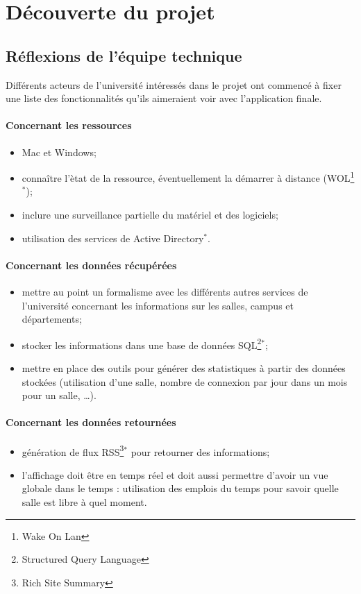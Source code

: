 \chapter{D\'ecouverte du projet}

\section{R\'eflexions de l'\'equipe technique}

Diff\'erents acteurs de l'universit\'e int\'eress\'es dans le projet \YuukouII{} ont commenc\'e \`a fixer une liste des fonctionnalit\'es qu'ils aimeraient voir avec l'application finale.

\subsubsection{Concernant les ressources}
\begin{itemize}
	\item Mac et Windows;
	\item conna\^itre l'\`etat de la ressource, \'eventuellement la d\'emarrer \`a distance (WOL\protect\footnote{Wake On Lan}$^*$);
	\item inclure une surveillance partielle du mat\'eriel et des logiciels;
	\item utilisation des services de Active Directory$^*$.

\end{itemize}

\subsubsection{Concernant les donn\'ees r\'ecup\'er\'ees}
\begin{itemize}
	\item mettre au point un formalisme avec les diff\'erents autres services de l'universit\'e concernant les informations sur les salles, campus et d\'epartements;
	\item stocker les informations dans une base de donn\'ees SQL\protect\footnote{Structured Query Language}$^*$;
	\item mettre en place des outils pour g\'en\'erer des statistiques \`a partir des donn\'ees stock\'ees (utilisation d'une salle, nombre de connexion par jour dans un mois pour un salle, \ldots).

\end{itemize}

\subsubsection{Concernant les donn\'ees retourn\'ees}
\begin{itemize}
	\item g\'en\'eration de flux RSS\protect\footnote{Rich Site Summary}$^*$ pour retourner des informations;
	\item l'affichage doit \^etre en temps r\'eel et doit aussi permettre d'avoir un vue globale dans le temps : utilisation des emplois du temps pour savoir quelle salle est libre \`a quel moment.

\end{itemize}

